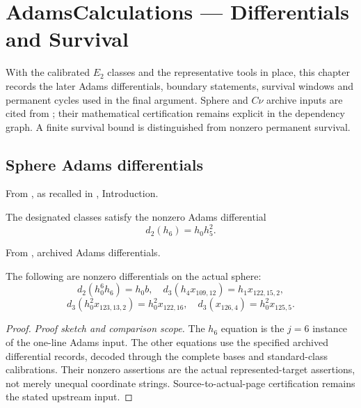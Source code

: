 \chapter{AdamsCalculations --- Differentials and Survival}
With the calibrated $E_2$ classes and the representative tools in place, this chapter records the later Adams differentials, boundary statements, survival windows and permanent cycles used in the final argument. Sphere and $C\nu$ archive inputs are cited from \cite{LinProgram}; their mathematical certification remains explicit in the dependency graph. A finite survival bound is distinguished from nonzero permanent survival.



\section{Sphere Adams differentials}


\begin{theorem}
\label{sem:Computation:low-differentials}
From \cite{Adams60}, as recalled in \cite{LWX126}, Introduction.\par
The designated classes satisfy the nonzero Adams differential
\[d_2(h_6)=h_0h_5^2.\]

From \cite{LinProgram}, archived Adams differentials.\par
The following are nonzero differentials on the actual sphere:
\[d_2(h_0^6h_6)=h_0b,\quad d_3(h_4x_{109,12})=h_1x_{122,15,2},\]
\[d_3(h_0^2x_{123,13,2})=h_0^2x_{122,16},\quad d_3(x_{126,4})=h_0^2x_{125,5}.\]
\end{theorem}
\begin{proof}
\textit{Proof sketch and comparison scope.}
The $h_6$ equation is the $j=6$ instance of the one-line Adams input.
The other equations use the specified archived differential records,
decoded through the complete bases and standard-class calibrations.
Their nonzero assertions are the actual represented-target assertions,
not merely unequal coordinate strings. Source-to-actual-page
certification remains the stated upstream input.
\end{proof}


